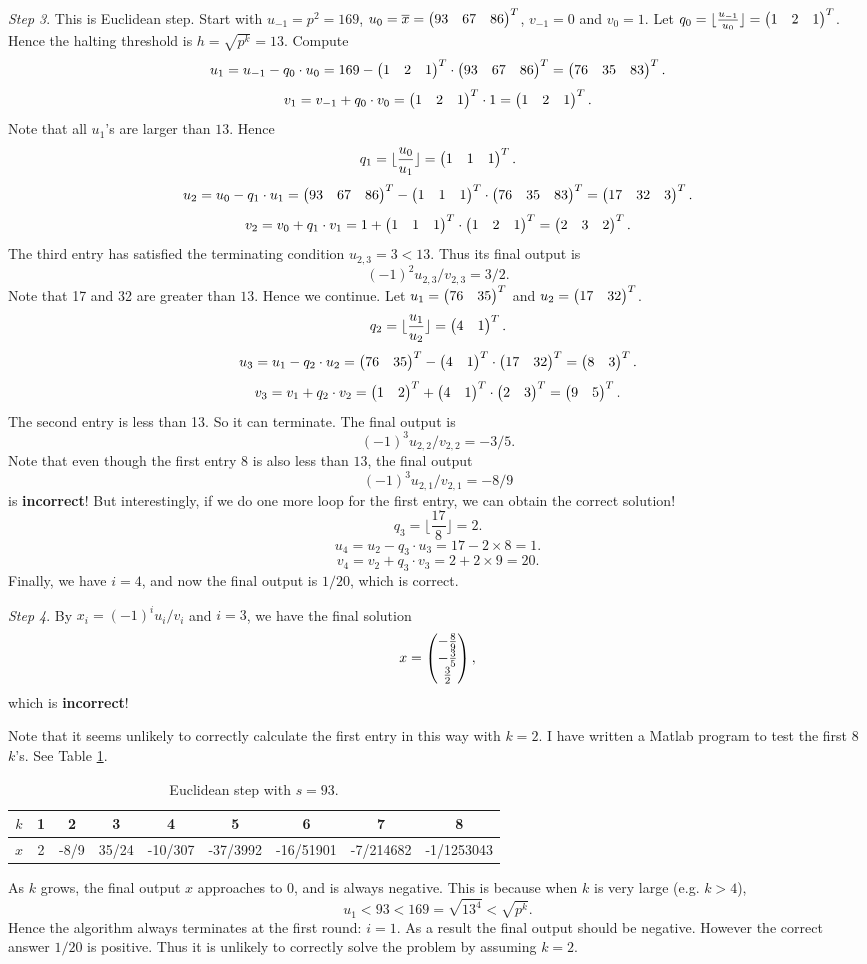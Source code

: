 \documentclass[12pt]{article}
\theoremstyle{plain}
\begin{document}
\emph{Step 3}. This is Euclidean step. Start with $u_{-1} = p^2 = 169$, $u_0=\overline{x} = \begin{pmatrix}93 & 67 & 86\end{pmatrix}^T$, $v_{-1} = 0$ and $v_0=1$. Let $q_0 = \lfloor \frac{u_{-1}}{u_0} \rfloor = \begin{pmatrix}1 & 2 & 1\end{pmatrix}^T$. Hence the halting threshold is $h = \sqrt{p^k} = 13$. Compute
$$u_1 = u_{-1} - q_0\cdot u_0 = 169 - \begin{pmatrix}1 & 2 & 1\end{pmatrix}^T \cdot \begin{pmatrix}93 & 67 & 86\end{pmatrix}^T = \begin{pmatrix}76 & 35 & 83\end{pmatrix}^T.$$
$$v_1 = v_{-1} + q_0\cdot v_0 = \begin{pmatrix}1 & 2 & 1\end{pmatrix}^T \cdot 1 = \begin{pmatrix}1 & 2 & 1\end{pmatrix}^T.$$
Note that all $u_1$'s are larger than $13$. Hence
$$q_1 = \lfloor \frac{u_0}{u_1} \rfloor = \begin{pmatrix}1 & 1 & 1\end{pmatrix}^T.$$
$$u_2 = u_0 - q_1\cdot u_1 = \begin{pmatrix}93 & 67 & 86\end{pmatrix}^T - \begin{pmatrix}1 & 1 & 1\end{pmatrix}^T \cdot \begin{pmatrix}76 & 35 & 83\end{pmatrix}^T = \begin{pmatrix}17 & 32 & 3\end{pmatrix}^T.$$
$$v_2 = v_0 + q_1\cdot v_1 = 1 + \begin{pmatrix}1 & 1 & 1\end{pmatrix}^T \cdot \begin{pmatrix}1 & 2 & 1\end{pmatrix}^T = \begin{pmatrix}2&3&2\end{pmatrix}^T.$$
The third entry has satisfied the terminating condition $u_{2,3} = 3 < 13$. Thus its final output is 
$$(-1)^2u_{2,3}/v_{2,3} = 3/2.$$
Note that 17 and 32 are greater than $13$. Hence we continue. Let $u_1 = \begin{pmatrix}76 & 35\end{pmatrix}^T$ and $u_2 = \begin{pmatrix}17 & 32\end{pmatrix}^T$.
$$q_2 = \lfloor \frac{u_1}{u_2} \rfloor = \begin{pmatrix}4 & 1\end{pmatrix}^T.$$
$$u_3 = u_1 - q_2\cdot u_2 = \begin{pmatrix}76 & 35\end{pmatrix}^T - \begin{pmatrix}4 & 1\end{pmatrix}^T \cdot \begin{pmatrix}17 & 32\end{pmatrix}^T = \begin{pmatrix}8 & 3\end{pmatrix}^T.$$
$$v_3 = v_1 + q_2\cdot v_2 = \begin{pmatrix}1 & 2\end{pmatrix}^T + \begin{pmatrix}4 & 1\end{pmatrix}^T \cdot \begin{pmatrix}2&3\end{pmatrix}^T = \begin{pmatrix}9 & 5\end{pmatrix}^T.$$
The second entry is less than 13. So it can terminate. The final output is 
$$(-1)^3u_{2,2}/v_{2,2} = -3/5.$$
Note that even though the first entry 8 is also less than $13$, the final output 
$$(-1)^3u_{2,1}/v_{2,1} = -8/9$$
 is {\bf incorrect}!
But interestingly, if we do one more loop for the first entry, we can obtain the correct solution!
$$q_3 = \lfloor \frac{17}{8} \rfloor = 2.$$
$$u_4 = u_2 - q_3\cdot u_3 = 17 - 2\times 8 = 1.$$
$$v_4 = v_2 + q_3\cdot v_3 = 2 + 2\times 9 = 20.$$
Finally, we have $i=4$, and now the final output is $1/20$, which is correct.

\emph{Step 4}. By $x_i = (-1)^i u_i/v_i$ and $i=3$, we have the final solution
$$x = \begin{pmatrix}-\frac{8}{9} \\ -\frac{3}{5} \\ \frac{3}{2}\end{pmatrix},$$
which is {\bf incorrect}!

Note that it seems unlikely to correctly calculate the first entry in this way with $k=2$. I have written a Matlab program to test the first 8 $k$'s. See Table \ref{tab:1}.
\begin{table}
\centering
\caption{Euclidean step with $s=93$.}
\begin{tabular}{c || c| c| c| c| c| c |c |c}
\hline
$k$ & 1 & 2 & 3 & 4 & 5 & 6 & 7 & 8\\
\hline
$x$ & 2 & -8/9 & 35/24 & -10/307 & -37/3992 & -16/51901 & -7/214682 & -1/1253043 \\
\hline
\end{tabular}
\label{tab:1}
\end{table}
As $k$ grows, the final output $x$ approaches to 0, and is always negative. This is because when $k$ is very large (e.g. $k>4$), 
$$u_1 < 93 < 169 = \sqrt{13^4} < \sqrt{p^k}.$$
Hence the algorithm always terminates at the first round: $i=1$. As a result the final output should be negative. However the correct answer $1/20$ is positive. Thus it is unlikely to correctly solve the problem by assuming $k=2$.
\end{document}
